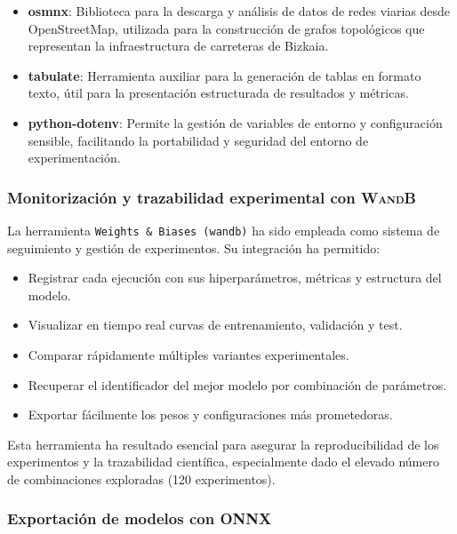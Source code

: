 \begin{itemize}
	\item \textbf{osmnx}: Biblioteca para la descarga y análisis de datos de redes viarias desde OpenStreetMap, utilizada para la construcción de grafos topológicos que representan la infraestructura de carreteras de Bizkaia.
	
	\item \textbf{tabulate}: Herramienta auxiliar para la generación de tablas en formato texto, útil para la presentación estructurada de resultados y métricas.
	
	\item \textbf{python-dotenv}: Permite la gestión de variables de entorno y configuración sensible, facilitando la portabilidad y seguridad del entorno de experimentación.
	
\end{itemize}

\subsubsection*{Monitorización y trazabilidad experimental con W\textsc{and}B}

La herramienta \texttt{Weights \& Biases (wandb)} ha sido empleada como sistema de seguimiento y gestión de experimentos. Su integración ha permitido:

\begin{itemize}
	\item Registrar cada ejecución con sus hiperparámetros, métricas y estructura del modelo.
	\item Visualizar en tiempo real curvas de entrenamiento, validación y test.
	\item Comparar rápidamente múltiples variantes experimentales.
	\item Recuperar el identificador del mejor modelo por combinación de parámetros.
	\item Exportar fácilmente los pesos y configuraciones más prometedoras.
\end{itemize}

Esta herramienta ha resultado esencial para asegurar la reproducibilidad de los experimentos y la trazabilidad científica, especialmente dado el elevado número de combinaciones exploradas (120 experimentos).

\subsubsection*{Exportación de modelos con ONNX}


